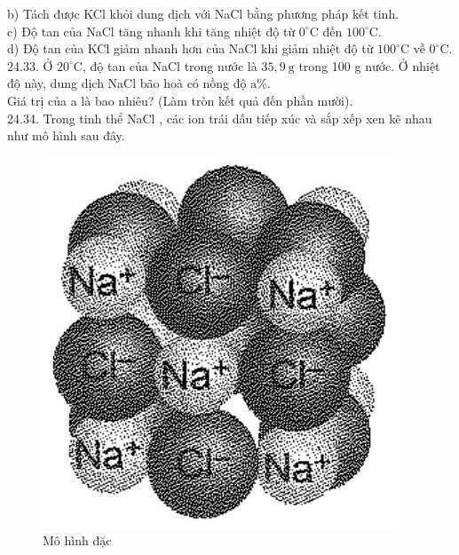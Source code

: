 \documentclass[10pt]{article}
\begin{document}
b) Tách được KCl khỏi dung dịch với NaCl bằng phương pháp kết tinh.\\
c) Độ tan của NaCl tăng nhanh khi tăng nhiệt độ từ $0^{\circ} \mathrm{C}$ đến $100^{\circ} \mathrm{C}$.\\
d) Độ tan của KCl giảm nhanh hơn của NaCl khi giảm nhiệt độ từ $100^{\circ} \mathrm{C}$ về $0^{\circ} \mathrm{C}$.\\
24.33. Ở $20^{\circ} \mathrm{C}$, độ tan của NaCl trong nước là $35,9 \mathrm{~g}$ trong 100 g nước. Ở nhiệt độ này, dung dịch NaCl bão hoà có nồng độ $\mathrm{a} \%$.\\
Giá trị của a là bao nhiêu? (Làm tròn kết quả đến phần mười).\\
24.34. Trong tinh thể NaCl , các ion trái dấu tiếp xúc và sắp xếp xen kẽ nhau như mô hình sau đây.

\begin{figure}[h]
\begin{center}
  \includegraphics[width=\textwidth]{2025_10_23_74efce88ce3a451fd6b0g-081(1)}
\captionsetup{labelformat=empty}
\caption{Mô hình đặc}
\end{center}
\end{figure}
\end{document}
